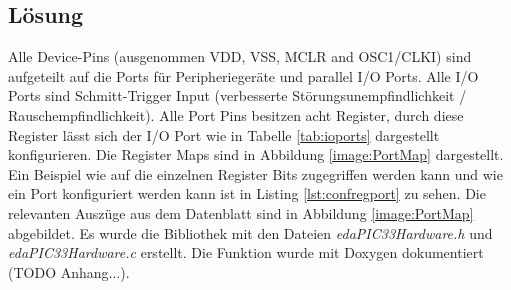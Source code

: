 \subsection{Lösung}
Alle Device-Pins (ausgenommen VDD, VSS, MCLR and OSC1/CLKI) sind aufgeteilt auf die Ports für Peripheriegeräte und parallel I/O Ports. Alle I/O Ports sind Schmitt-Trigger Input (verbesserte Störungsunempfindlichkeit / Rauschempfindlichkeit).\newline
Alle Port Pins besitzen acht Register, durch diese Register lässt sich der I/O Port wie in Tabelle \ref{tab:ioports} dargestellt konfigurieren. Die Register Maps sind in Abbildung \ref{image:PortMap} dargestellt.\newline\newline
Ein Beispiel wie auf die einzelnen Register Bits zugegriffen werden kann und wie ein Port konfiguriert werden kann ist in Listing \ref{lst:confregport} zu sehen.\newline\newline
Die relevanten Auszüge aus dem Datenblatt sind in Abbildung \ref{image:PortMap} abgebildet.\newline\newline
Es wurde die Bibliothek mit den Dateien \textit{edaPIC33Hardware.h} und \textit{edaPIC33Hardware.c} erstellt. Die Funktion wurde mit Doxygen dokumentiert (TODO Anhang...).

